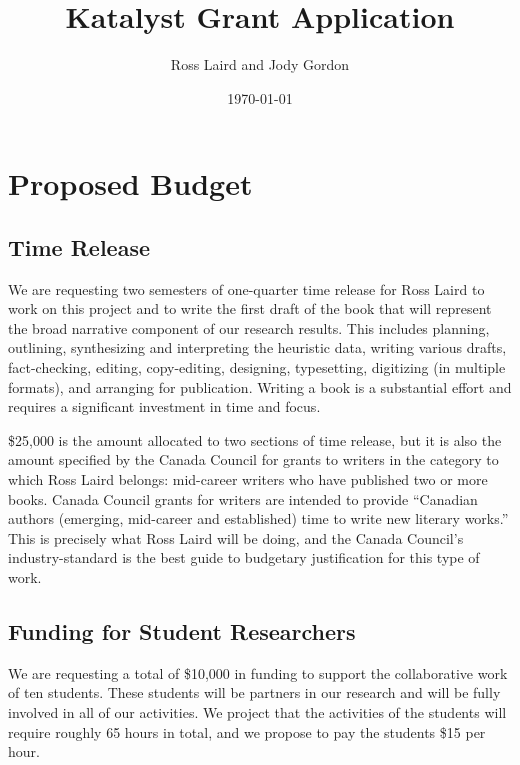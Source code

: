 \documentclass[letterpaper,10pt,headsepline]{scrreprt}
\author{Ross Laird and Jody Gordon}
\title{Katalyst Grant Application}
\date{\today}
\begin{document}
\begin{titlingpage}
\begin{center}
\maketitle
\end{center}
\end{titlingpage}
\setcounter{tocdepth}{3}
\tableofcontents

\vspace*{1cm}

\section{Proposed Budget}

\subsection{Time Release}

We are requesting two semesters of one-quarter time release for Ross Laird to
work on this project and to write the first draft of the book that will
represent the broad narrative component of our research results. This includes
planning, outlining, synthesizing and interpreting the heuristic data, writing
various drafts, fact-checking, editing, copy-editing, designing, typesetting,
digitizing (in multiple formats), and arranging for publication. Writing a
book is a substantial effort and requires a significant investment in time and
focus.

\$25,000 is the amount allocated to two sections of time release, but it is
also the amount specified by the Canada Council for grants to writers in the
category to which Ross Laird belongs: mid-career writers who have published
two or more books. Canada Council grants for writers are intended to provide
``Canadian authors (emerging, mid-career and established) time to write new
literary works.'' This is precisely what Ross Laird will be doing, and the Canada
Council's industry-standard is the best guide to budgetary justification for
this type of work.

\subsection{Funding for Student Researchers}

We are requesting a total of \$10,000 in funding to support the collaborative
work of ten students. These students will be partners in our research and will
be fully involved in all of our activities. We project that the activities of
the students will require roughly 65 hours in total, and we propose to pay the
students \$15 per hour.
\end{document}
